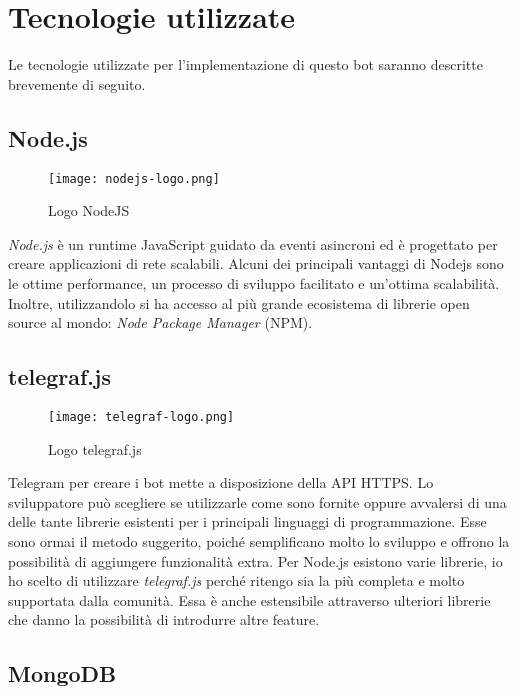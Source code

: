\pagebreak

\section{Tecnologie utilizzate}
\label{sec:tecnologie}

Le tecnologie utilizzate per l'implementazione di questo bot saranno descritte brevemente di seguito. 

\subsection{Node.js}

\begin{wrapfigure}{r}{0.33\textwidth}
\centering
\texttt{[image: nodejs-logo.png]}
\caption{Logo NodeJS}
\end{wrapfigure}

\textit{Node.js} è un runtime JavaScript guidato da eventi asincroni ed è progettato per creare applicazioni di rete scalabili. Alcuni dei principali vantaggi di Nodejs sono le ottime performance, un processo di sviluppo facilitato e un'ottima scalabilità. Inoltre, utilizzandolo si ha accesso al più grande ecosistema di librerie open source al mondo: \textit{Node Package Manager} (NPM).

\subsection{telegraf.js}

\begin{wrapfigure}{r}{0.33\textwidth}
\centering
\texttt{[image: telegraf-logo.png]}
\caption{Logo telegraf.js}
\end{wrapfigure}

Telegram per creare i bot mette a disposizione della API HTTPS. Lo sviluppatore può scegliere se utilizzarle come sono fornite oppure avvalersi di una delle tante librerie esistenti per i principali linguaggi di programmazione. Esse sono ormai il metodo suggerito, poiché semplificano molto lo sviluppo e offrono la possibilità di aggiungere funzionalità extra. Per Node.js esistono varie librerie, io ho scelto di utilizzare \textit{telegraf.js} perché ritengo sia la più completa e molto supportata dalla comunità. Essa è anche estensibile attraverso ulteriori librerie che danno la possibilità di introdurre altre feature.

\subsection{MongoDB}

